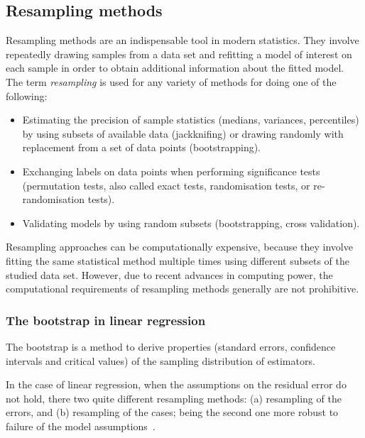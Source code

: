 \subsection{Resampling methods}\label{sec:resampling}
Resampling methods are an indispensable tool in modern statistics. They involve repeatedly drawing samples from a data set and refitting a model of interest on each sample in order to obtain additional information about the fitted model. The term \emph{resampling} is used for any variety of methods for doing one of the following:
\begin{itemize}
	\item Estimating the precision of sample statistics (medians, variances, percentiles) by using subsets of available data (jackknifing) or drawing randomly with replacement from a set of data points (bootstrapping).
	\item Exchanging labels on data points when performing significance tests (permutation tests, also called exact tests, randomisation tests, or re-randomisation tests).
	\item Validating models by using random subsets (bootstrapping, cross validation).
\end{itemize}

Resampling approaches can be computationally expensive, because they involve fitting the same statistical method multiple times using different subsets of the studied data set. However, due to recent advances in computing power, the computational requirements of resampling methods generally are not prohibitive.

\subsubsection{The bootstrap in linear regression}\label{ssec:boot-theory}
The bootstrap is a method to derive properties (standard errors, confidence intervals and critical values) of the sampling distribution of estimators.

In the case of linear regression, when the assumptions on the residual error do not hold, there two quite different resampling methods: (a) resampling of the errors, and (b) resampling of the cases; being the second one more robust to failure of the model assumptions~\cite{Hinkley1997}.

